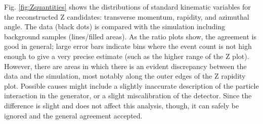 Fig. \ref{fig:Zquantities} shows the distributions of standard kinematic 
variables for the reconstructed Z candidates: transverse momentum, rapidity, and azimuthal angle. 
The data (black dots) is compared with the simulation including 
background samples (lines/filled areas).  
As the ratio plots show, the agreement is good in general; 
large error bars indicate bins where the event count is not 
high enough to give a very precise estimate 
(such as the higher range of the Z \pt plot).  
However, there are areas in which there is an evident discrepancy 
between the data and the simulation, 
most notably along the outer edges of the Z rapidity plot.  
Possible causes might include a slightly inaccurate description of the particle 
interaction in the generator, 
or a slight miscalibration of the detector.  
Since the difference is slight and does not affect this analysis, though, 
it can safely be ignored and the general agreement accepted.  


